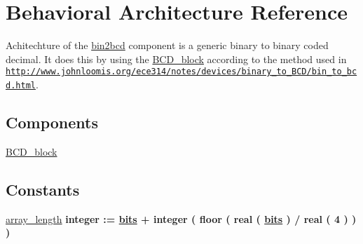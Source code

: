 \hypertarget{classbin2bcd_1_1Behavioral}{\section{Behavioral Architecture Reference}
\label{classbin2bcd_1_1Behavioral}
}


Achitechture of the \hyperlink{classbin2bcd}{bin2bcd}  component is a generic binary to binary coded decimal. It does this by using the \hyperlink{classBCD__block}{B\-C\-D\-\_\-block} according to the method used in \href{http://www.johnloomis.org/ece314/notes/devices/binary_to_BCD/bin_to_bcd.html}{\tt http\-://www.\-johnloomis.\-org/ece314/notes/devices/binary\-\_\-to\-\_\-\-B\-C\-D/bin\-\_\-to\-\_\-bcd.\-html}.  


\subsection*{Components}
 \begin{DoxyCompactItemize}
\item 
\hypertarget{classbin2bcd_1_1Behavioral_a357931df7e16eeffe2988c1e4f48a75f}{\hyperlink{classbin2bcd_1_1Behavioral_a357931df7e16eeffe2988c1e4f48a75f}{B\-C\-D\-\_\-block}  {\bfseries }  }\label{classbin2bcd_1_1Behavioral_a357931df7e16eeffe2988c1e4f48a75f}

\end{DoxyCompactItemize}
\subsection*{Constants}
 \begin{DoxyCompactItemize}
\item 
\hypertarget{classbin2bcd_1_1Behavioral_a0cc376987d43bd9d544cbaede089b0cf}{\hyperlink{classbin2bcd_1_1Behavioral_a0cc376987d43bd9d544cbaede089b0cf}{array\-\_\-length} {\bfseries \textcolor{comment}{integer}\textcolor{vhdlchar}{ }\textcolor{vhdlchar}{ }\textcolor{vhdlchar}{\-:}\textcolor{vhdlchar}{=}\textcolor{vhdlchar}{ }{\bfseries \hyperlink{classbin2bcd_a03ce448558c2218cb8d7efccef340e15}{bits}} \textcolor{vhdlchar}{ }\textcolor{vhdlchar}{+}\textcolor{vhdlchar}{ }\textcolor{comment}{integer}\textcolor{vhdlchar}{ }\textcolor{vhdlchar}{(}\textcolor{vhdlchar}{ }\textcolor{vhdlchar}{ }\textcolor{vhdlchar}{floor}\textcolor{vhdlchar}{ }\textcolor{vhdlchar}{(}\textcolor{vhdlchar}{ }\textcolor{vhdlchar}{ }\textcolor{comment}{real}\textcolor{vhdlchar}{ }\textcolor{vhdlchar}{(}\textcolor{vhdlchar}{ }\textcolor{vhdlchar}{ }{\bfseries \hyperlink{classbin2bcd_a03ce448558c2218cb8d7efccef340e15}{bits}} \textcolor{vhdlchar}{ }\textcolor{vhdlchar}{)}\textcolor{vhdlchar}{ }\textcolor{vhdlchar}{ }\textcolor{vhdlchar}{/}\textcolor{vhdlchar}{ }\textcolor{comment}{real}\textcolor{vhdlchar}{ }\textcolor{vhdlchar}{(}\textcolor{vhdlchar}{ }\textcolor{vhdlchar}{ } \textcolor{vhdldigit}{4} \textcolor{vhdlchar}{ }\textcolor{vhdlchar}{)}\textcolor{vhdlchar}{ }\textcolor{vhdlchar}{ }\textcolor{vhdlchar}{)}\textcolor{vhdlchar}{ }\textcolor{vhdlchar}{ }\textcolor{vhdlchar}{)}\textcolor{vhdlchar}{ }} }\label{classbin2bcd_1_1Behavioral_a0cc376987d43bd9d544cbaede089b0cf}

\end{DoxyCompactItemize}
